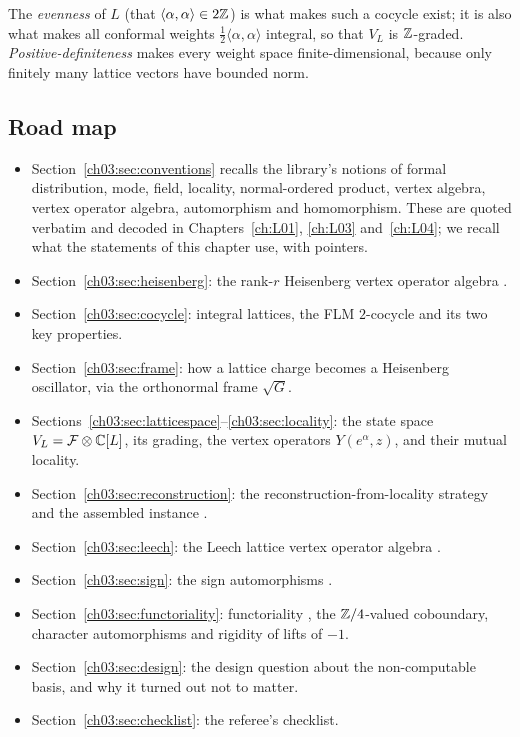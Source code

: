 The \emph{evenness} of $L$ (that $\langle\alpha,\alpha\rangle\in 2{\mathbb{Z}}$) is what makes such a cocycle
exist; it is also what makes all conformal weights $\frac12\langle\alpha,\alpha\rangle$ integral, so
that $V_L$ is ${\mathbb{Z}}$-graded. \emph{Positive-definiteness} makes every weight space
finite-dimensional, because only finitely many lattice vectors have bounded norm.

\subsection{Road map}

\begin{itemize}[leftmargin=2em]
\item Section~\ref{ch03:sec:conventions} recalls the library's notions of formal
  distribution, mode, field, locality, normal-ordered product, vertex algebra, vertex operator
  algebra, automorphism and homomorphism. These are quoted verbatim and decoded in
  Chapters~\ref{ch:L01}, \ref{ch:L03} and~\ref{ch:L04}; we recall what the statements of this
  chapter use, with pointers.
\item Section~\ref{ch03:sec:heisenberg}: the rank-$r$ Heisenberg vertex operator algebra
  .
\item Section~\ref{ch03:sec:cocycle}: integral lattices, the FLM $2$-cocycle
   and its two key properties.
\item Section~\ref{ch03:sec:frame}: how a lattice charge becomes a Heisenberg oscillator, via the
  orthonormal frame $\sqrt G$.
\item Sections~\ref{ch03:sec:latticespace}--\ref{ch03:sec:locality}: the state space
  $V_L=\mathcal F\otimes{\mathbb{C}}[L]$, its grading, the vertex operators $Y(e^\alpha,z)$, and their mutual
  locality.
\item Section~\ref{ch03:sec:reconstruction}: the reconstruction-from-locality strategy and the
  assembled instance .
\item Section~\ref{ch03:sec:leech}: the Leech lattice vertex operator algebra
  .
\item Section~\ref{ch03:sec:sign}: the sign automorphisms .
\item Section~\ref{ch03:sec:functoriality}: functoriality , the
  ${\mathbb{Z}}/4$-valued coboundary, character automorphisms and rigidity of lifts of $-1$.
\item Section~\ref{ch03:sec:design}: the design question about the non-computable basis, and why
  it turned out not to matter.
\item Section~\ref{ch03:sec:checklist}: the referee's checklist.
\end{itemize}

